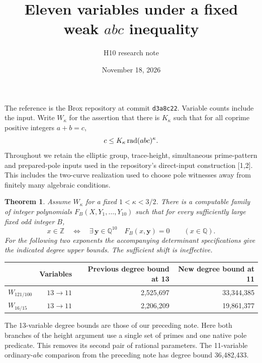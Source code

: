 \documentclass[11pt]{article}
\title{Eleven variables under a fixed weak \texorpdfstring{$abc$}{abc} inequality}
\author{H10 research note}
\date{November 18, 2026}
\newcommand{\Q}{\mathbb Q}\newcommand{\Z}{\mathbb Z}
\newtheorem{theorem}{Theorem}\newtheorem{lemma}[theorem]{Lemma}
\begin{document}
\maketitle
\newcommand{\PPt}{P_0}
The reference is the Brox repository at commit \texttt{d3a8c22}. Variable counts include the input. Write $W_\kappa$ for the assertion that there is $K_\kappa$ such that for all coprime positive integers $a+b=c$,
\[
 c\le K_\kappa\operatorname{rad}(abc)^\kappa.
\]
Throughout we retain the elliptic group, trace-height, simultaneous prime-pattern and prepared-pole inputs used in the repository's direct-input construction [1,2]. This includes the two-curve realization used to choose pole witnesses away from finitely many algebraic conditions.
\begin{theorem}
Assume $W_\kappa$ for a fixed $1<\kappa<3/2$. There is a computable family of integer polynomials $F_B(X,Y_1,\ldots,Y_{10})$ such that for every sufficiently large fixed odd integer $B$,
\[
 x\in\Z\quad\Longleftrightarrow\quad
 \exists\,\mathbf y\in\Q^{10}\quad F_B(x,\mathbf y)=0
 \qquad (x\in\Q).
\]
For the following two exponents the accompanying determinant specifications give the indicated degree upper bounds. The sufficient shift is ineffective.
\end{theorem}
\begin{center}\small
\begin{tabular}{lrrr}\toprule
 &Variables&Previous degree bound at 13&New degree bound at 11\\\midrule
$W_{121/100}$ & $13\to11$ &2,525,697&33,344,385\\
$W_{16/15}$ & $13\to11$ &2,206,209&19,861,377\\\bottomrule
\end{tabular}
\end{center}
The 13-variable degree bounds are those of our preceding note. Here both branches of the height argument use a single set of primes and one native pole predicate. This removes its second pair of rational parameters. The 11-variable ordinary-$abc$ comparison from the preceding note has degree bound 36,482,433.
\end{document}
